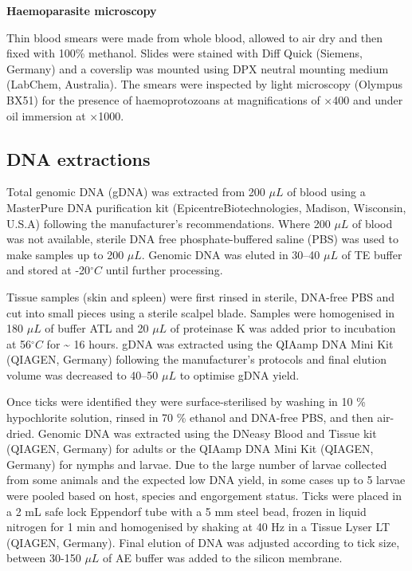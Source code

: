 \documentclass[a4paper, nobind]{templates/ociamthesis}
\begin{document}
\textbf{Haemoparasite microscopy}

Thin blood smears were made from whole blood, allowed to air dry and then fixed with 100\% methanol.
Slides were stained with Diff Quick (Siemens, Germany) and a coverslip was mounted using DPX neutral mounting medium (LabChem, Australia).
The smears were inspected by light microscopy (Olympus BX51) for the presence of haemoprotozoans at magnifications of ×400 and under oil immersion at ×1000.

\hypertarget{dna-extractions-1}{%
\subsection{DNA extractions}\label{dna-extractions-1}}

Total genomic DNA (gDNA) was extracted from 200 \(\mu L\) of blood using a MasterPure DNA purification kit (Epicentre\textregistered Biotechnologies, Madison, Wisconsin, U.S.A) following the manufacturer's recommendations.
Where 200 \(\mu L\) of blood was not available, sterile DNA free phosphate-buffered saline (PBS) was used to make samples up to 200 \(\mu L\). Genomic DNA was eluted in 30--40 \(\mu L\) of TE buffer and stored at -20\(^\circ C\) until further processing.

Tissue samples (skin and spleen) were first rinsed in sterile, DNA-free PBS and cut into small pieces using a sterile scalpel blade. Samples were homogenised in 180 \(\mu L\) of buffer ATL and 20 \(\mu L\) of proteinase K was added prior to incubation at 56\(^\circ C\) for \textasciitilde{} 16 hours. gDNA was extracted using the QIAamp DNA Mini Kit (QIAGEN, Germany) following the manufacturer's protocols and final elution volume was decreased to 40--50 \(\mu L\) to optimise gDNA yield.

Once ticks were identified they were surface-sterilised by washing in 10 \% hypochlorite solution, rinsed in 70 \% ethanol and DNA-free PBS, and then air-dried.
Genomic DNA was extracted using the DNeasy Blood and Tissue kit (QIAGEN, Germany) for adults or the QIAamp DNA Mini Kit (QIAGEN, Germany) for nymphs and larvae.
Due to the large number of larvae collected from some animals and the expected low DNA yield, in some cases up to 5 larvae were pooled based on host, species and engorgement status.
Ticks were placed in a 2 mL safe lock Eppendorf tube with a 5 mm steel bead, frozen in liquid nitrogen for 1 min and homogenised by shaking at 40 Hz in a Tissue Lyser LT (QIAGEN, Germany).
Final elution of DNA was adjusted according to tick size, between 30-150 \(\mu L\) of AE buffer was added to the silicon membrane.
\end{document}
